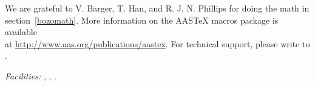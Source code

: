 \documentclass[preprint2]{aastex}
\begin{document}

\acknowledgments

We are grateful to V. Barger, T. Han, and R. J. N. Phillips for
doing the math in section~\ref{bozomath}.
More information on the AASTeX macros package is available \\ at
\url{http://www.aas.org/publications/aastex}.
For technical support, please write to
.



{\it Facilities:} , , .


\end{document}
